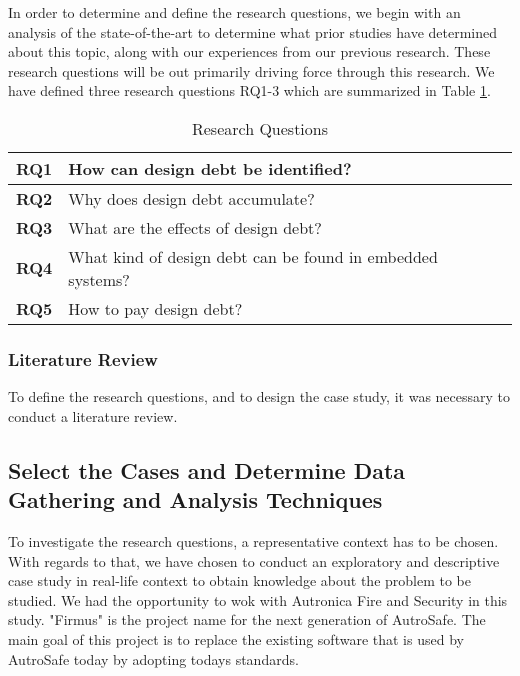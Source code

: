 In order to determine and define the research questions, we begin with an analysis of the state-of-the-art to determine what prior studies have determined about this topic, along with our experiences from our previous research. These research questions will be out primarily driving force through this research. We have defined three research questions RQ1-3 which are summarized in Table \ref{researchQuestionsChapter3}.

\begin{table}[]
	\centering
	\caption{Research Questions}
	\label{researchQuestionsChapter3}
	\begin{tabular}{|l|p{8cm}|}
		\hline
		\textbf{RQ1} & How can design debt be identified?     \\ \hline
		\textbf{RQ2} & Why does design debt accumulate? \\ \hline
		\textbf{RQ3} & What are the effects of design debt?  \\ \hline
		\textbf{RQ4} & What kind of design debt can be found in embedded systems? \\ \hline
		\textbf{RQ5} & How to pay design debt? \\ \hline
	\end{tabular}
\end{table}


\subsubsection{Literature Review}
To define the research questions, and to design the case study, it was necessary to conduct a literature review. 




\subsection{Select the Cases and Determine Data Gathering and Analysis Techniques} %
To investigate the research questions, a representative context has to be chosen. With regards to that, we have chosen to conduct an exploratory and descriptive case study in real-life context to obtain knowledge about the problem to be studied. We had the opportunity to wok with Autronica Fire and Security in this study. "Firmus" is the project name for the next generation of AutroSafe. The main goal of this project is to replace the existing software that is used by AutroSafe today by adopting todays standards.


